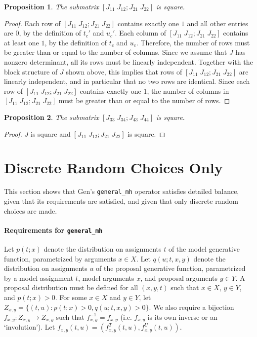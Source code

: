 \documentclass{article}
\newtheorem{prop}{Proposition}
\begin{document}
\begin{prop}
The submatrix $[J_{11} \; J_{12}; J_{21} \; J_{22}]$ is square.
\end{prop}
\begin{proof}
Each row of $[J_{11} \; J_{12}; J_{21} \; J_{22}]$ contains exactly one $1$ and all other entries are $0$, by the definition of $t_c'$ and $u_c'$.
Each column of $[J_{11} \; J_{12}; J_{21} \; J_{22}]$ contains at least one $1$, by the definition of $t_c$ and $u_c$.
Therefore, the number of rows must be greater than or equal to the number of columns.
Since we assume that $J$ has nonzero determinant, all its rows must be linearly independent.
Together with the block structure of $J$ shown above, this implies that rows of $[J_{11} \; J_{12}; J_{21} \; J_{22}]$ are linearly independent, and in particular that no two rows are identical.
Since each row of $[J_{11} \; J_{12}; J_{21} \; J_{22}]$ contains exactly one $1$, the number of columns in $[J_{11} \; J_{12}; J_{21} \; J_{22}]$ must be greater than or equal to the number of rows.
\end{proof}

\begin{prop}
The submatrix $[J_{33} \; J_{34}; J_{43} \; J_{44}]$ is square.
\end{prop}
\begin{proof}
$J$ is square and $[J_{11} \; J_{12}; J_{21} \; J_{22}]$ is square.
\end{proof}



 

\section{Discrete Random Choices Only}
This section shows that Gen's \texttt{general\_mh} operator satisfies detailed balance, given that its requirements are satisfied, and given that only discrete random choices are made.

\paragraph{Requirements for \texttt{general\_mh}}
Let $p(t; x)$ denote the distribution on assignments $t$ of the model generative function, parametrized by arguments $x \in X$.
Let $q(u; t, x, y)$ denote the distribution on assignments $u$ of the proposal generative function, parametrized by a model assignment $t$, model arguments $x$, and proposal arguments $y \in Y$.
A proposal distribution must be defined for all $(x, y, t)$ such that $x \in X$, $y \in Y$, and $p(t; x) > 0$.
For some $x \in X$ and $y \in Y$, let $Z_{x,y} = \{(t, u) : p(t; x) > 0, q(u; t, x, y) > 0\}$.
We also require a bijection $f_{x,y} : Z_{x,y} \to Z_{x,y}$ such that $f^{-1}_{x,y} = f_{x,y}$ (i.e. $f_{x,y}$ is its own inverse or an `involution').
Let $f_{x,y}(t, u) = (f^T_{x,y}(t, u), f^U_{x,y}(t, u))$.
\end{document}
